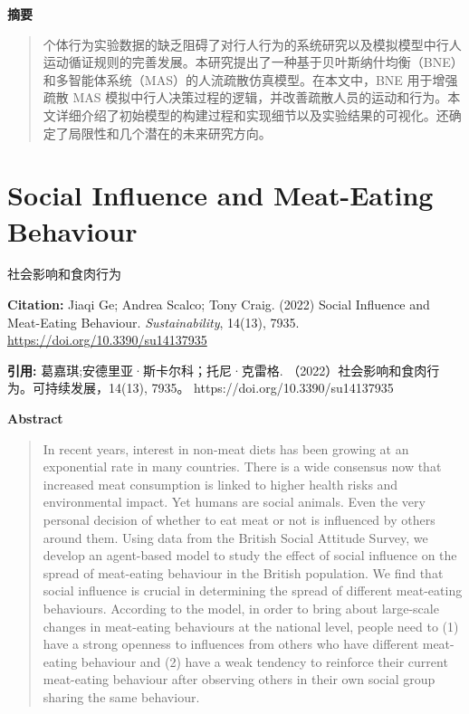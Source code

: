 \noindent\textbf{摘要}\par
\begin{quote}\small
个体行为实验数据的缺乏阻碍了对行人行为的系统研究以及模拟模型中行人运动循证规则的完善发展。本研究提出了一种基于贝叶斯纳什均衡（BNE）和多智能体系统（MAS）的人流疏散仿真模型。在本文中，BNE 用于增强疏散 MAS 模拟中行人决策过程的逻辑，并改善疏散人员的运动和行为。本文详细介绍了初始模型的构建过程和实现细节以及实验结果的可视化。还确定了局限性和几个潜在的未来研究方向。
\end{quote}

\vspace{0.5em}


\chapter{Social Influence and Meat-Eating Behaviour}
\begin{center}\small 社会影响和食肉行为\end{center}

\noindent\textbf{Citation:} Jiaqi Ge; Andrea Scalco; Tony Craig. (2022) Social Influence and Meat-Eating Behaviour. \textit{Sustainability}, 14(13), 7935. \url{https://doi.org/10.3390/su14137935}

\vspace{0.5em}
\noindent\textbf{引用:} 葛嘉琪;安德里亚·斯卡尔科；托尼·克雷格. （2022）社会影响和食肉行为。可持续发展，14(13), 7935。 https://doi.org/10.3390/su14137935

\vspace{1.5em}
\noindent\textbf{Abstract}\par
\begin{quote}\small
In recent years, interest in non-meat diets has been growing at an exponential rate in many countries. There is a wide consensus now that increased meat consumption is linked to higher health risks and environmental impact. Yet humans are social animals. Even the very personal decision of whether to eat meat or not is influenced by others around them. Using data from the British Social Attitude Survey, we develop an agent-based model to study the effect of social influence on the spread of meat-eating behaviour in the British population. We find that social influence is crucial in determining the spread of different meat-eating behaviours. According to the model, in order to bring about large-scale changes in meat-eating behaviours at the national level, people need to (1) have a strong openness to influences from others who have different meat-eating behaviour and (2) have a weak tendency to reinforce their current meat-eating behaviour after observing others in their own social group sharing the same behaviour.
\end{quote}

